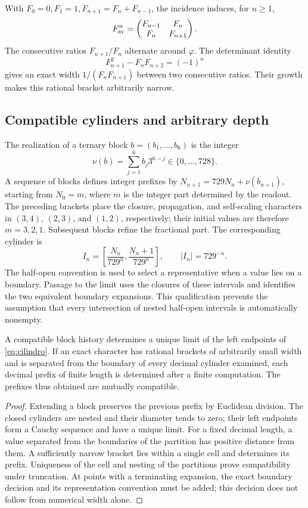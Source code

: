 With \(F_0=0,F_1=1,F_{n+1}=F_n+F_{n-1}\), the incidence induces, for \(n\geq1\),
\[
 F_{\rm av}^n=\begin{pmatrix}F_{n-1}&F_n\\F_n&F_{n+1}\end{pmatrix}.
\]
The consecutive ratios \(F_{n+1}/F_n\) alternate around \(\varphi\). The determinant identity
\[
 F_{n+1}^2-F_nF_{n+2}=(-1)^n
\]
gives an exact width \(1/(F_nF_{n+1})\) between two consecutive ratios. Their growth makes this rational bracket arbitrarily narrow.

\subsection{Compatible cylinders and arbitrary depth}

The realization of a ternary block \(b=(b_1,\ldots,b_6)\) is the integer
\[
 \nu(b)=\sum_{j=1}^6b_j3^{6-j}\in\{0,\ldots,728\}.
\]
A sequence of blocks defines integer prefixes by \(N_{n+1}=729N_n+\nu(b_{n+1})\), starting from \(N_0=m\), where \(m\) is the integer part determined by the readout. The preceding brackets place the closure, propagation, and self-scaling characters in \((3,4)\), \((2,3)\), and \((1,2)\), respectively; their initial values are therefore \(m=3,2,1\). Subsequent blocks refine the fractional part. The corresponding cylinder is
\begin{equation}
 I_n=\left[\frac{N_n}{729^n},\frac{N_n+1}{729^n}\right],
 \qquad |I_n|=729^{-n}.
 \label{eq:cilindro}
\end{equation}
The half-open convention is used to select a representative when a value lies on a boundary. Passage to the limit uses the closures of these intervals and identifies the two equivalent boundary expansions. This qualification prevents the assumption that every intersection of nested half-open intervals is automatically nonempty.

\begin{theorem}
A compatible block history determines a unique limit of the left endpoints of \eqref{eq:cilindro}. If an exact character has rational brackets of arbitrarily small width and is separated from the boundary of every decimal cylinder examined, each decimal prefix of finite length is determined after a finite computation. The prefixes thus obtained are mutually compatible.
\end{theorem}
\begin{proof}
Extending a block preserves the previous prefix by Euclidean division. The closed cylinders are nested and their diameter tends to zero; their left endpoints form a Cauchy sequence and have a unique limit. For a fixed decimal length, a value separated from the boundaries of the partition has positive distance from them. A sufficiently narrow bracket lies within a single cell and determines its prefix. Uniqueness of the cell and nesting of the partitions prove compatibility under truncation. At points with a terminating expansion, the exact boundary decision and its representation convention must be added; this decision does not follow from numerical width alone.
\end{proof}

